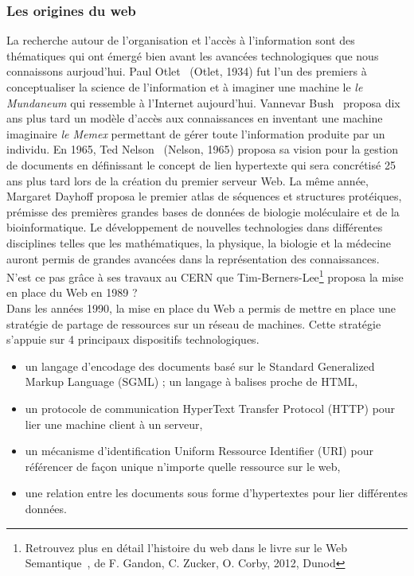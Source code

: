 \subsubsection*{Les origines du web}

La recherche autour de l’organisation et l’accès à l’information sont des thématiques qui ont émergé bien avant les avancées technologiques que nous connaissons aurjoud'hui. Paul Otlet~\cite{Otlet1934} (Otlet, 1934) fut l'un des premiers à conceptualiser la science de l'information et à imaginer une machine le \textit{ le Mundaneum} qui ressemble à l'Internet aujourd'hui. Vannevar Bush~\cite{Vandenbussche2011} proposa dix ans plus tard un modèle d'accès aux connaissances en inventant une machine imaginaire  \textit{le Memex} permettant de gérer toute l'information produite par un individu. En 1965, Ted Nelson~\cite{Nelson1991} (Nelson, 1965) proposa sa vision pour la gestion de documents en définissant le concept de lien hypertexte qui sera concrétisé 25 ans plus tard lors de la création du premier serveur Web. La même année, Margaret Dayhoff proposa le premier atlas de séquences et structures protéiques, prémisse des premières grandes bases de données de biologie moléculaire et de la bioinformatique. Le développement de nouvelles technologies dans différentes disciplines telles que les mathématiques, la physique, la biologie et la médecine auront permis de grandes avancées dans la représentation des connaissances. N'est ce pas grâce à ses travaux au CERN que Tim-Berners-Lee\footnote{Retrouvez plus en détail l'histoire du web dans le livre sur le Web Semantique~\cite{GandonFZuckerCorby2012}, de F. Gandon, C. Zucker, O. Corby, 2012, Dunod}  proposa la mise en place du Web en 1989 ? \\

Dans les années 1990, la mise en place du Web a permis de mettre en place une stratégie de partage de ressources sur un réseau de machines. Cette stratégie s'appuie sur 4 principaux dispositifs technologiques.


\begin{itemize}
\item un langage d’encodage des documents basé sur le Standard Generalized Markup Language (SGML) ; un langage à balises proche de HTML,
\item un protocole de communication HyperText Transfer Protocol (HTTP) pour lier une machine client à un serveur,
\item un mécanisme d’identification Uniform Ressource Identifier (URI) pour référencer de façon unique n’importe quelle ressource sur le web,
\item une relation entre les documents sous forme d’hypertextes pour lier différentes données.
\end{itemize}

